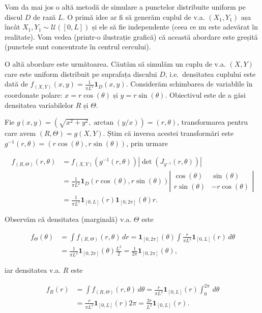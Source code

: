 \documentclass[]{article}
\begin{document}
Vom da mai jos o altă metodă de simulare a punctelor distribuite uniform
pe discul \(D\) de rază \(L\). O primă idee ar fi să generăm cuplul de
v.a. \((X_1,Y_1)\) așa încât \(X_1,Y_1\sim\mathcal{U}([0,L])\) și ele să
fie independente (ceea ce nu este adevărat în realitate). Vom vedea
(printr-o ilustrație grafică) că această abordare este greșită (punctele
sunt concentrate în centrul cercului).

O altă abordare este următoarea. Căutăm să simulăm un cuplu de v.a.
\((X,Y)\) care este uniform distribuit pe suprafața discului \(D\),
i.e.~densitatea cuplului este dată de
\(f_{(X,Y)}(x,y)=\frac{1}{\pi L^2}\mathbf{1}_{D}(x,y)\). Considerăm
schimbarea de variablile în coordonate polare: \(x=r\cos(\theta)\) și
\(y=r\sin(\theta)\). Obiectivul este de a găsi densitatea variabilelor
\(R\) și \(\Theta\).

Fie \(g(x,y)=\left(\sqrt{x^2+y^2},\arctan(y/x)\right)=(r,\theta)\),
transformarea pentru care avem \((R,\Theta)=g(X,Y)\). Știm că inversa
acestei transformări este
\(g^{-1}(r,\theta)=(r\cos(\theta),r\sin(\theta))\), prin urmare

\[
\begin{aligned}
  f_{(R,\Theta)}(r,\theta) &= f_{(X,Y)}\left(g^{-1}(r,\theta)\right)|\det(J_{g^{-1}}(r,\theta))|\\
                &= \frac{1}{\pi L^2}\mathbf{1}_{D}(r\cos(\theta),r\sin(\theta))\left|\begin{array}{cc}
                    \cos(\theta) & \sin(\theta)\\
                    r\sin(\theta) & -r\cos(\theta)
                \end{array}\right|\\
                &= \frac{1}{\pi L^2} \mathbf{1}_{[0,L]}(r)\mathbf{1}_{[0,2\pi]}(\theta)r.
\end{aligned}
\]

Observăm că densitatea (marginală) v.a. \(\Theta\) este

\[
\begin{aligned}
  f_{\Theta}(\theta) &= \int f_{(R,\Theta)}(r,\theta)\,dr = \mathbf{1}_{[0,2\pi]}(\theta)\int \frac{r}{\pi L^2} \mathbf{1}_{[0,L]}(r)\,d\theta\\
                     &= \frac{1}{\pi L^2} \mathbf{1}_{[0,2\pi]}(\theta) \frac{L^2}{2} = \frac{1}{2\pi} \mathbf{1}_{[0,2\pi]}(\theta),
\end{aligned}
\]

iar densitatea v.a. \(R\) este

\[
\begin{aligned}
  f_{R}(r) &= \int f_{(R,\Theta)}(r,\theta)\,d\theta = \frac{r}{\pi L^2} \mathbf{1}_{[0,L]}(r)\int_{0}^{2\pi}\,d\theta\\
                     &= \frac{r}{\pi L^2} \mathbf{1}_{[0,L]}(r)2\pi = \frac{2r}{L^2} \mathbf{1}_{[0,L]}(r).
\end{aligned}
\]
\end{document}
